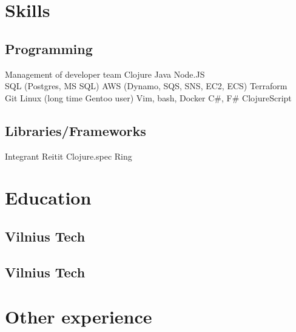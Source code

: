\documentclass[]{plushcv}
\begin{document}
\hfill
\begin{minipage}[t]{0.25\textwidth} 


\section{Skills}
\subsection{Programming}
\sectionsep
{}
Management of developer team 
\textbullet{} 
Clojure \textbullet{} Java \textbullet{} Node.JS \textbullet{} \\ 
SQL (Postgres, MS SQL) \textbullet{} AWS (Dynamo, SQS, SNS, EC2, ECS) \textbullet{} Terraform \textbullet{} \\
Git \textbullet{} Linux (long time Gentoo user) \textbullet{} Vim, bash, Docker
\sectionsep
\sectionsep
{}
C\#, F\# \textbullet{} ClojureScript \textbullet{}  \\
\sectionsep
\sectionsep
\subsection{Libraries/Frameworks}
\sectionsep
Integrant \textbullet{} Reitit \textbullet{} Clojure.spec \textbullet{} Ring \\
\sectionsep
\sectionsep



\section{Education} 
\subsection{Vilnius Tech}
\sectionsep
\subsection{Vilnius Tech}
\sectionsep

\section{Other experience} 

\end{minipage}
\end{document}

